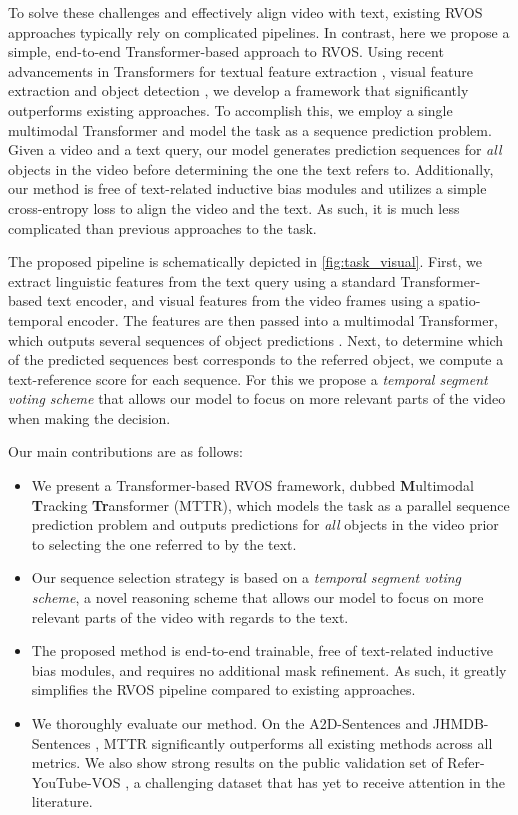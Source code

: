 \documentclass[10pt,twocolumn,letterpaper]{article}
\renewcommand{\cite}[1]{\citep{#1}}
\newcommand{\methodname}{MTTR}
\begin{document}
To solve these challenges and effectively align video with text, existing RVOS approaches \cite{hui2021cstm,liu2021cmpc,ning2020polar} typically rely on complicated pipelines. In contrast, here we propose a simple, end-to-end Transformer-based approach to RVOS. Using recent advancements in Transformers for textual feature extraction \cite{vaswani2017attention,liu2019roberta}, visual feature extraction \cite{ViT_2021,liu2021swin, liu2021vswin} and object detection \cite{carion2020detr,wang2021vistr}, we develop a framework that significantly outperforms existing approaches.
To accomplish this, we employ a single multimodal Transformer and model the task as a sequence prediction problem. Given a video and a text query, our model generates prediction sequences for \textit{all} objects in the video before determining the one the text refers to. Additionally, our method is free of text-related inductive bias modules and utilizes a simple cross-entropy loss to align the video and the text. As such, it is much less complicated than previous approaches to the task.

The proposed pipeline is schematically depicted in \cref{fig:task_visual}. 
First, we extract linguistic features from the text query using a standard Transformer-based text encoder, and visual features from the video frames using a spatio-temporal encoder. The features are then passed into a multimodal Transformer, which outputs several sequences of object predictions \cite{wang2021vistr}. Next, to determine which of the predicted sequences best corresponds to the referred object, we compute a text-reference score for each sequence. For this we propose a \textit{temporal segment voting scheme} that allows our model to focus on more relevant parts of the video when making the decision.

Our main contributions are as follows:
\begin{itemize}
\item We present a Transformer-based RVOS framework, dubbed \textbf{M}ultimodal \textbf{T}racking \textbf{Tr}ansformer (\methodname{}), which models the task as a parallel sequence prediction problem and outputs predictions for \textit{all} objects in the video prior to selecting the one referred to by the text.
\item Our sequence selection strategy is based on a \textit{temporal segment voting scheme}, a novel reasoning scheme that allows our model to focus on more relevant parts of the video with regards to the text.
\item The proposed method is end-to-end trainable, free of text-related inductive bias modules, and requires no additional mask refinement. As such, it greatly simplifies the RVOS pipeline compared to existing approaches.
\item We thoroughly evaluate our method. On the A2D-Sentences and JHMDB-Sentences \cite{gavrilyuk2018a2d}, \methodname{} significantly outperforms all existing methods across all metrics. We also show strong results on the public validation set of Refer-YouTube-VOS \cite{seo2020urvos}, a challenging dataset that has yet to receive attention in the literature.
\end{itemize}
\end{document}
